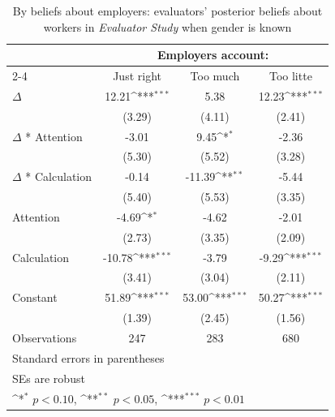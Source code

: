 \begin{table}[htbp]\centering
\def\sym#1{\ifmmode^{#1}\else\(^{#1}\)\fi}
\caption{By beliefs about employers: evaluators' posterior beliefs about workers in \textit{Evaluator Study} when gender is known}
\begin{tabular}{l*{3}{c}}
\hline\hline
                &\multicolumn{3}{c}{Employers account:}                  \\\cmidrule(lr){2-4}
                &\multicolumn{1}{c}{Just right}&\multicolumn{1}{c}{Too much}&\multicolumn{1}{c}{Too litte}\\
\hline
$\Delta$        &    12.21\sym{***}&     5.38         &    12.23\sym{***}\\
                &   (3.29)         &   (4.11)         &   (2.41)         \\
$\Delta$ * Attention&    -3.01         &     9.45\sym{*}  &    -2.36         \\
                &   (5.30)         &   (5.52)         &   (3.28)         \\
$\Delta$ * Calculation&    -0.14         &   -11.39\sym{**} &    -5.44         \\
                &   (5.40)         &   (5.53)         &   (3.35)         \\
Attention       &    -4.69\sym{*}  &    -4.62         &    -2.01         \\
                &   (2.73)         &   (3.35)         &   (2.09)         \\
Calculation     &   -10.78\sym{***}&    -3.79         &    -9.29\sym{***}\\
                &   (3.41)         &   (3.04)         &   (2.11)         \\
Constant        &    51.89\sym{***}&    53.00\sym{***}&    50.27\sym{***}\\
                &   (1.39)         &   (2.45)         &   (1.56)         \\
\hline
Observations    &      247         &      283         &      680         \\
\hline\hline
\multicolumn{4}{l}{\footnotesize Standard errors in parentheses}\\
\multicolumn{4}{l}{\footnotesize SEs are robust}\\
\multicolumn{4}{l}{\footnotesize \sym{*} \(p<0.10\), \sym{**} \(p<0.05\), \sym{***} \(p<0.01\)}\\
\end{tabular}
\end{table}
